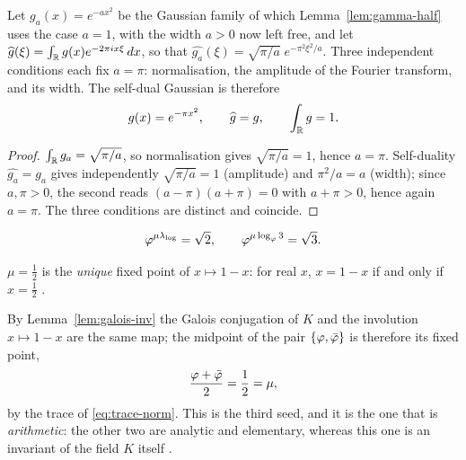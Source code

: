 \begin{proposition}\label{prop:selfdual-gaussian}
Let $g_a(x)=e^{-a x^{2}}$ be the Gaussian family of which
Lemma~\ref{lem:gamma-half} uses the case $a=1$, with the width $a>0$ now left free, and let $\widehat g(\xi)=\int_{\mathbb{R}} g(x)e^{-2\pi i x\xi}\,dx$, so that
$\widehat{g_a}(\xi)=\sqrt{\pi/a}\;e^{-\pi^{2}\xi^{2}/a}$. Three independent conditions
each fix $a=\pi$: normalisation, the amplitude of the Fourier
transform, and its width. The self-dual Gaussian is therefore
\begin{equation}\label{eq:selfdual-gaussian}
  g(x)=e^{-\pi x^{2}},\qquad \widehat g=g,\qquad \int_{\mathbb{R}}g=1 .
\end{equation}

\end{proposition}
\begin{proof}
$\int_{\mathbb{R}}g_a=\sqrt{\pi/a}$, so normalisation gives $\sqrt{\pi/a}=1$, hence $a=\pi$.
Self-duality $\widehat{g_a}=g_a$ gives independently $\sqrt{\pi/a}=1$ (amplitude) and
$\pi^{2}/a=a$ (width); since $a,\pi>0$, the second reads $(a-\pi)(a+\pi)=0$ with
$a+\pi>0$, hence again $a=\pi$. The three conditions are distinct and coincide.
\end{proof}
\begin{proposition}\label{prop:mediation}
\begin{equation}\label{eq:mediation}
\varphi^{\mu\lambda_{\log}}=\sqrt2,\qquad
\varphi^{\mu\log_\varphi 3}=\sqrt3 .
\end{equation}

\end{proposition}

\begin{proposition}\label{prop:phi-branch}
$\mu=\tfrac12$ is the \emph{unique} fixed point of $x\mapsto1-x$: for real $x$, $x=1-x$ if and
only if $x=\tfrac12$ .
\end{proposition}

\begin{proposition}\label{prop:galois-seed}
By Lemma~\ref{lem:galois-inv} the Galois conjugation of $K$ and the involution $x\mapsto1-x$ are
the same map; the midpoint of the pair $\{\varphi,\bar{\varphi}\}$ is therefore its fixed point,
\begin{equation}\label{eq:galois-seed}
  \frac{\varphi+\bar{\varphi}}{2}=\frac12=\mu ,
\end{equation}
by the trace of \eqref{eq:trace-norm}. This is the third seed, and it is the one that is
\emph{arithmetic}: the other two are analytic and elementary, whereas this one is an invariant
of the field $K$ itself .
\end{proposition}

